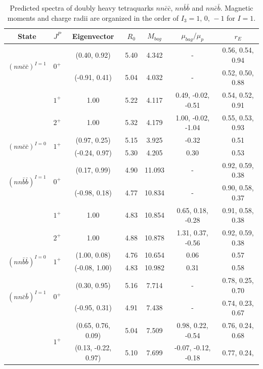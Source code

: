 \documentclass[prd,twocolumn,floatfix,nofootinbib]{revtex4}
\begin{document}
\renewcommand{\tabcolsep}{0.40cm} \renewcommand{\arraystretch}{1.2}
\begin{table}[!htb]
\caption{Predicted spectra of doubly heavy tetraquarks $nn\bar{c}\bar{c}$, $%
nn\bar{b}\bar{b}$ and $nn\bar{c}\bar{b}$. Magnetic moments and charge radii
are organized in the order of $I_{3}=1,\,0,\,-1$ for $I=1$.}
\label{tab:2heavytetraquark1}%
\begin{tabular}{ccccccc}
\hline\hline
\textrm{State} & $J^{P}$ & \textrm{Eigenvector} & $R_{0}$ & $M_{bag}$ & $%
\mu_{bag}/\mu_{p}$ & $r_{E}$ \\ \hline
\multirow{2}{*}{${(nn\bar{c}\bar{c})}^{I=1}$} & \multirow{2}{*}{$0^{+}$} &
(0.40, 0.92) & 5.40 & 4.342 & - & 0.56, 0.54, 0.94 \\
&  & (-0.91, 0.41) & 5.04 & 4.032 & - & 0.52, 0.50, 0.88 \\
& $1^{+}$ & 1.00 & 5.22 & 4.117 & 0.49, -0.02, -0.51 & 0.54, 0.52, 0.91 \\
& $2^{+}$ & 1.00 & 5.32 & 4.179 & 1.00, -0.02, -1.04 & 0.55, 0.53, 0.93 \\
\multirow{2}{*}{${(nn\bar{c}\bar{c})}^{I=0}$} & \multirow{2}{*}{$1^{+}$} &
(0.97, 0.25) & 5.15 & 3.925 & -0.32 & 0.51 \\
&  & (-0.24, 0.97) & 5.30 & 4.205 & 0.30 & 0.53 \\
\multirow{2}{*}{${(nn\bar{b}\bar{b})}^{I=1}$} & \multirow{2}{*}{$0^{+}$} &
(0.17, 0.99) & 4.90 & 11.093 & - & 0.92, 0.59, 0.38 \\
&  & (-0.98, 0.18) & 4.77 & 10.834 & - & 0.90, 0.58, 0.37 \\
& $1^{+}$ & 1.00 & 4.83 & 10.854 & 0.65, 0.18, -0.28 & 0.91, 0.58, 0.38 \\
& $2^{+}$ & 1.00 & 4.88 & 10.878 & 1.31, 0.37, -0.56 & 0.92, 0.59, 0.38 \\
\multirow{2}{*}{${(nn\bar{b}\bar{b})}^{I=0}$} & \multirow{2}{*}{$1^{+}$} &
(1.00, 0.08) & 4.76 & 10.654 & 0.06 & 0.57 \\
&  & (-0.08, 1.00) & 4.83 & 10.982 & 0.31 & 0.58 \\
\multirow{2}{*}{${(nn\bar{c}\bar{b})}^{I=1}$} & \multirow{2}{*}{$0^{+}$} &
(0.30, 0.95) & 5.16 & 7.714 & - & 0.78, 0.25, 0.70 \\
&  & (-0.95, 0.31) & 4.91 & 7.438 & - & 0.74, 0.23, 0.67 \\
& \multirow{3}{*}{$1^{+}$} & (0.65, 0.76, 0.09) & 5.04 & 7.509 & 0.98, 0.22,
-0.54 & 0.76, 0.24, 0.68 \\
&  & (0.13, -0.22, 0.97) & 5.10 & 7.699 & -0.07, -0.12, -0.18 & 0.77, 0.24,

\end{tabular}
\end{table}
\end{document}
